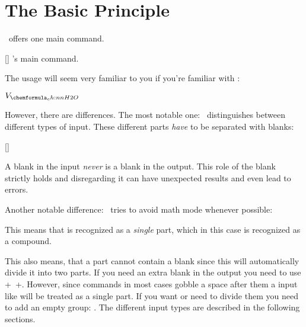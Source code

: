 \documentclass[load-preamble+]{cnltx-doc}
\begin{document}
\section{The Basic Principle}
\chemformula\ offers one main command.
\begin{commands}
  []
    \chemformula's main command.
\end{commands}
The usage will seem very familiar to you if you're familiar with :
\begin{example}
   \par
   \par
   \par
   \par
   \par
  \ch{[AgCl2]-} \par
   \par
   \par
   \par
   \par
   \par
   \par
  $V_{\ch{H2O}}$ \par
   \par
\end{example}

However, there are differences.  The most notable one: \chemformula\
distinguishes between different types of input.  These different parts
\emph{have} to be separated with blanks:
\begin{commands}
  []
\end{commands}
A blank in the input \emph{never} is a blank in the output.  This role of the
blank strictly holds and disregarding it can have unexpected results and even
lead to errors.

Another notable difference: \chemformula\ tries to avoid math mode whenever
possible:
\begin{example}
   \par
\end{example}

This means that  is recognized as a \emph{single} part,
which in this case is recognized as a compound.
\begin{example}
   \par
  \ch{2 H2O}
\end{example}
This also means, that a part cannot contain a blank since this will
automatically divide it into two parts.  If you need an extra blank in the
output you need to use \verbcode+~+.  However, since commands in most cases
gobble a space after them a input like \Marg{\cs*{command} ABC} will be
treated as a single part.  If you want or need to divide them you need to add
an empty group: \cs{ch}\Marg{\cs*{command}\marg{} ABC}.  The different input
types are described in the following sections.
\end{document}
